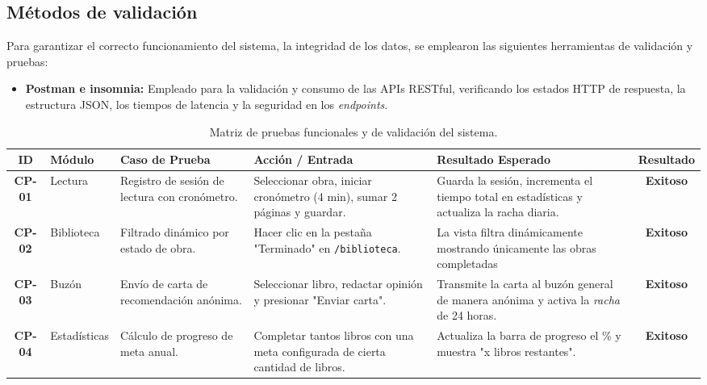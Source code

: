 \documentclass[12pt, atypical, journal]{article}
\begin{document}
\subsection{Métodos de validación}
Para garantizar el correcto funcionamiento del sistema, la integridad de los datos, se emplearon las siguientes herramientas de validación y pruebas:

\begin{itemize}
	\item \textbf{Postman e insomnia:} Empleado para la validación y consumo de las APIs RESTful, verificando los estados HTTP de respuesta, la estructura JSON, los tiempos de latencia y la seguridad en los \textit{endpoints}.
\end{itemize}

\begin{table}[H]
	\centering
	\small
	\begin{tabular}{|c|l|p{3.5cm}|p{3.5cm}|p{3.5cm}|c|}
		\hline
		\textbf{ID} & \textbf{Módulo} & \textbf{Caso de Prueba} & \textbf{Acción / Entrada} & \textbf{Resultado Esperado} & \textbf{Resultado} \\ \hline
		
		\textbf{CP-01} & Lectura & 
		Registro de sesión de lectura con cronómetro. & 
		Seleccionar obra, iniciar cronómetro (4 min), sumar 2 páginas y guardar. & 
		Guarda la sesión, incrementa el tiempo total en estadísticas y actualiza la racha diaria. & 
		\textbf{Exitoso} \\ \hline
		
		\textbf{CP-02} & Biblioteca & 
		Filtrado dinámico por estado de obra. & 
		Hacer clic en la pestaña "Terminado" en  \texttt{/biblioteca}. & 
		La vista filtra dinámicamente mostrando únicamente las obras completadas & 
		\textbf{Exitoso} \\ \hline
		
		\textbf{CP-03} & Buzón & 
		Envío de carta de recomendación anónima. & 
		Seleccionar libro, redactar opinión y presionar "Enviar carta". & 
		Transmite la carta al buzón general de manera anónima y activa la \textit{racha} de 24 horas. & 
		\textbf{Exitoso} \\ \hline
		
		\textbf{CP-04} & Estadísticas & 
		Cálculo de progreso de meta anual. & 
		Completar tantos libros con una meta configurada de cierta cantidad de libros. & 
		Actualiza la barra de progreso el \% y muestra "x libros restantes". & 
		\textbf{Exitoso} \\ \hline
		
	\end{tabular}
	\caption{Matriz de pruebas funcionales y de validación del sistema.}
	\label{tab:casos_prueba}
\end{table}
\end{document}
